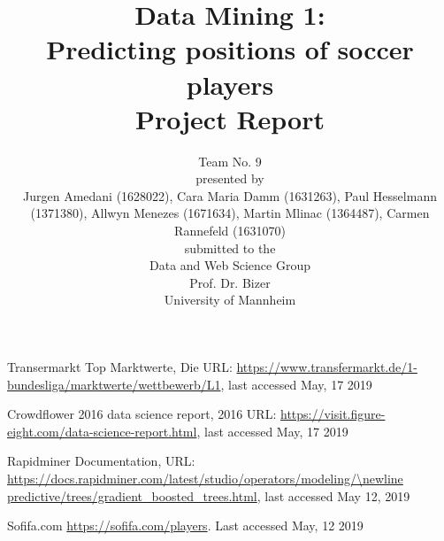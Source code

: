\documentclass[runningheads]{llncs}
\begin{document}
%
\title{Data Mining 1: \\
Predicting positions of soccer players  \\
Project Report}

\vspace{2cm}
\author{Team No. 9\\
\vspace{1cm}
presented by\\
Jurgen Amedani (1628022), Cara Maria Damm (1631263), Paul Hesselmann (1371380), Allwyn Menezes (1671634), Martin Mlinac (1364487), Carmen Rannefeld (1631070)\\
\vspace{1cm}
submitted to the \\
Data and Web Science Group\\
Prof. Dr. Bizer\\
University of Mannheim}

\institute{}
\maketitle              %
\newpage




\newpage









%
%



%
\begin{thebibliography}{8}

Transermarkt Top Marktwerte, Die   URL: \url{https://www.transfermarkt.de/1-bundesliga/marktwerte/wettbewerb/L1}, last accessed May, 17 2019

Crowdflower 2016 data science report, 2016   URL: \url{https://visit.figure-eight.com/data-science-report.html}, last accessed May, 17 2019


Rapidminer Documentation, URL: \url{https://docs.rapidminer.com/latest/studio/operators/modeling/\newline predictive/trees/gradient\_boosted\_trees.html}, last accessed May 12, 2019

Sofifa.com \url{https://sofifa.com/players}. Last accessed May, 12 2019





\end{thebibliography}
\end{document}
